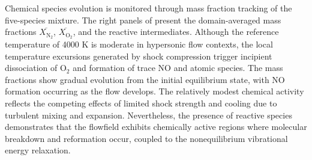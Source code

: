 Chemical species evolution is monitored through mass fraction tracking of the five-species mixture. The right panels of  present the domain-averaged mass fractions $\overline{X_{\text{N}_2}}$, $\overline{X_{\text{O}_2}}$, and the reactive intermediates. Although the reference temperature of 4000 K is moderate in hypersonic flow contexts, the local temperature excursions generated by shock compression trigger incipient dissociation of O$_2$ and formation of trace NO and atomic species. The mass fractions show gradual evolution from the initial equilibrium state, with NO formation occurring as the flow develops. The relatively modest chemical activity reflects the competing effects of limited shock strength and cooling due to turbulent mixing and expansion. Nevertheless, the presence of reactive species demonstrates that the flowfield exhibits chemically active regions where molecular breakdown and reformation occur, coupled to the nonequilibrium vibrational energy relaxation.




